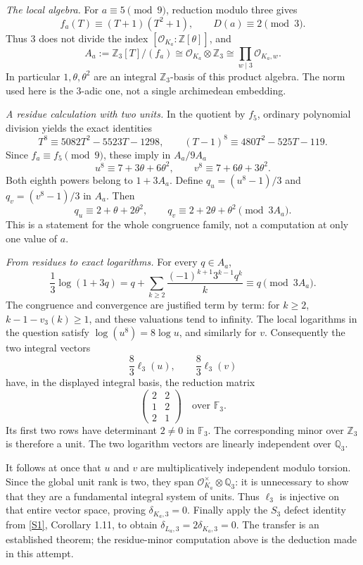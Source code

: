 \documentclass[11pt,a4paper]{article}
\newcommand{\Z}{\mathbb{Z}}
\newcommand{\Q}{\mathbb{Q}}
\newcommand{\F}{\mathbb{F}}
\newcommand{\sref}[2]{\hyperlink{source:#1:#2}{[S#2]}}
\numberwithin{equation}{section}
\begin{document}
\textit{The local algebra.} For $a\equiv5\pmod9$, reduction modulo three
gives
\[
 f_a(T)\equiv(T+1)(T^2+1),\qquad D(a)\equiv2\pmod3.
\]
Thus $3$ does not divide the index $[\mathcal O_{K_a}:\Z[\theta]]$, and
\[
 A_a:=\Z_3[T]/(f_a)\cong\mathcal O_{K_a}\otimes\Z_3
          \cong\prod_{w\mid3}\mathcal O_{K_a,w}.
\]
In particular $1,\theta,\theta^2$ are an integral $\Z_3$-basis of this
product algebra. The norm used here is the $3$-adic one, not a single
archimedean embedding.

\textit{A residue calculation with two units.} In the quotient by $f_5$,
ordinary polynomial division yields the exact identities
\[
 T^8\equiv5082T^2-5523T-1298,\qquad
 (T-1)^8\equiv480T^2-525T-119.
\]
Since $f_a\equiv f_5\pmod9$, these imply in $A_a/9A_a$
\[
 u^8\equiv7+3\theta+6\theta^2,
 \qquad v^8\equiv7+6\theta+3\theta^2.
\]
Both eighth powers belong to $1+3A_a$. Define
$q_u=(u^8-1)/3$ and $q_v=(v^8-1)/3$ in $A_a$. Then
\begin{equation}\label{eq156-residues}
 q_u\equiv2+\theta+2\theta^2,\qquad
 q_v\equiv2+2\theta+\theta^2\pmod{3A_a}.
\end{equation}
This is a statement for the whole congruence family, not a computation at
only one value of $a$.

\textit{From residues to exact logarithms.} For every $q\in A_a$,
\[
 \frac13\log(1+3q)
 =q+\sum_{k\ge2}\frac{(-1)^{k+1}3^{k-1}q^k}{k}
 \equiv q\pmod{3A_a}.
\]
The congruence and convergence are justified term by term: for $k\ge2$,
$k-1-v_3(k)\ge1$, and these valuations tend to infinity. The local
logarithms in the question satisfy $\log(u^8)=8\log u$, and similarly for
$v$. Consequently the two integral vectors
\[
 \frac83\ell_3(u),\qquad\frac83\ell_3(v)
\]
have, in the displayed integral basis, the reduction matrix
\begin{equation}\label{eq156-minor}
 \begin{pmatrix}2&2\\1&2\\2&1\end{pmatrix}\quad\text{over }\F_3.
\end{equation}
Its first two rows have determinant $2\ne0$ in $\F_3$. The corresponding
minor over $\Z_3$ is therefore a unit. The two logarithm vectors are
linearly independent over $\Q_3$.

It follows at once that $u$ and $v$ are multiplicatively independent modulo
torsion. Since the global unit rank is two, they span
$\mathcal O_{K_a}^{\times}\otimes\Q_3$: it is unnecessary to show that they
are a fundamental integral system of units. Thus $\ell_3$ is injective on
that entire vector space, proving $\delta_{K_a,3}=0$. Finally apply the
$S_3$ defect identity from \sref{statement}{1}, Corollary 1.11, to obtain
$\delta_{L_a,3}=2\delta_{K_a,3}=0$. The transfer is an established theorem;
the residue-minor computation above is the deduction made in this attempt.
\end{document}
